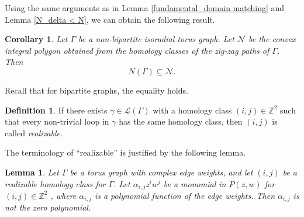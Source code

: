 \documentclass[12pt,a4paper]{article}
\newtheorem{cor}[thm]{Corollary}
\newtheorem{lem}[thm]{Lemma}
\theoremstyle{definition}
\newtheorem{defi}[thm]{Definition}
\begin{document}
Using the same arguments as in Lemma \ref{fundamental_domain matching} and Lemma \ref{N_delta < N}, we can obtain the following result.

\begin{cor} \label{N < zigzag polygon}
    Let $\Gamma$ be a non-bipartite isoradial torus graph. Let $\mathcal{N}$ be the convex integral polygon obtained from the homology classes of the zig-zag paths of $\Gamma$. Then
    \[N(\Gamma) \subseteq \mathcal{N}.\]
\end{cor}

Recall that for bipartite graphs, the equality holds.

\begin{defi}
    If there exists $\gamma \in \mathcal{L}(\Gamma)$ with a homology class $(i,j) \in \mathbb{Z}^2$ such that every non-trivial loop in $\gamma$ has the same homology class, then $(i,j)$ is called \emph{realizable}. 
\end{defi}

The terminology of ``realizable'' is justified by the following lemma.

\begin{lem} \label{nonvanishing_coeffs}
    Let $\Gamma$ be a torus graph with complex edge weights, and let $(i,j)$ be a realizable homology class for $\Gamma$. Let $\alpha_{i,j} z^i w^j$ be a monomial in $P(z,w)$ for $(i,j) \in \mathbb{Z}^2$ , where $\alpha_{i,j}$ is a polynomial function of the edge weights. Then $\alpha_{i,j}$ is not the zero polynomial.
\end{lem}
\end{document}
